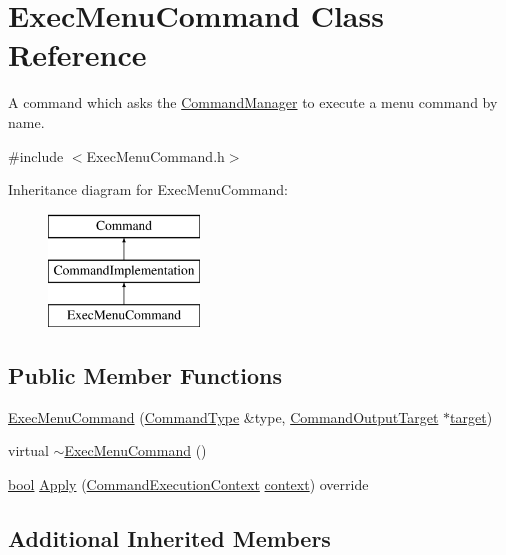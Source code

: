\hypertarget{class_exec_menu_command}{}\section{Exec\+Menu\+Command Class Reference}
\label{class_exec_menu_command}


A command which asks the \hyperlink{class_command_manager}{Command\+Manager} to execute a menu command by name.  




{\ttfamily \#include $<$Exec\+Menu\+Command.\+h$>$}

Inheritance diagram for Exec\+Menu\+Command\+:\begin{figure}[H]
\begin{center}
\leavevmode
\includegraphics[height=3.000000cm]{class_exec_menu_command}
\end{center}
\end{figure}
\subsection*{Public Member Functions}
\begin{DoxyCompactItemize}
\item 
\hyperlink{class_exec_menu_command_a51d22684298eff2147b4a07d098d0ef5}{Exec\+Menu\+Command} (\hyperlink{class_command_type}{Command\+Type} \&type, \hyperlink{class_command_output_target}{Command\+Output\+Target} $\ast$\hyperlink{lib_2expat_8h_a15a257516a87decb971420e718853137}{target})
\item 
virtual \hyperlink{class_exec_menu_command_a8a197b26fe92ede145d71ee92ab52538}{$\sim$\+Exec\+Menu\+Command} ()
\item 
\hyperlink{mac_2config_2i386_2lib-src_2libsoxr_2soxr-config_8h_abb452686968e48b67397da5f97445f5b}{bool} \hyperlink{class_exec_menu_command_ab2e2e6f369fcc328efd164deaa0e8740}{Apply} (\hyperlink{class_command_execution_context}{Command\+Execution\+Context} \hyperlink{structcontext}{context}) override
\end{DoxyCompactItemize}
\subsection*{Additional Inherited Members}


